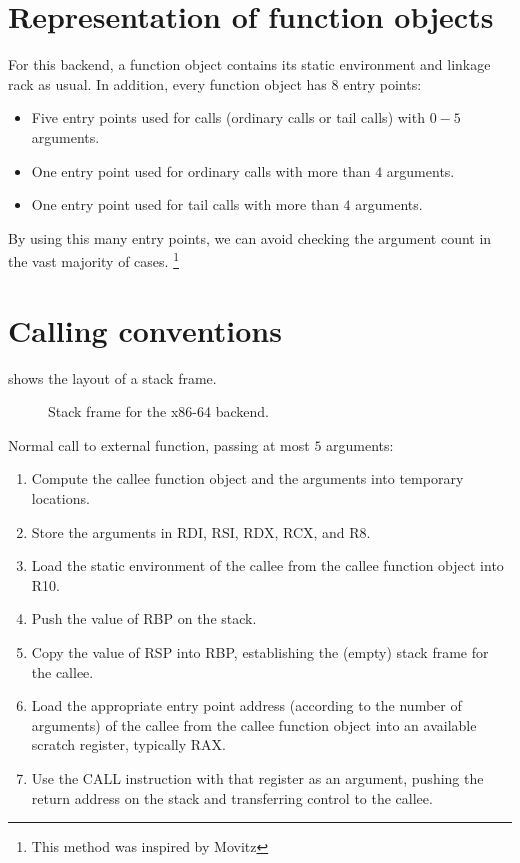 \section{Representation of function objects}

For this backend, a function object contains its static environment
and linkage rack as usual.  In addition, every function object has
$8$ entry points:

\begin{itemize}
\item Five entry points used for calls (ordinary calls or tail calls)
  with $0 - 5$ arguments.
\item One entry point used for ordinary calls with more than $4$
  arguments.
\item One entry point used for tail calls with more than $4$
  arguments.
\end{itemize}

By using this many entry points, we can avoid checking the argument
count in the vast majority of cases.%
\footnote{This method was inspired by Movitz}

\section{Calling conventions}

 shows the layout of a stack frame.

\begin{figure}
\begin{center}
\end{center}
\caption{\label{fig-x86-64-stack-frame}
Stack frame for the x86-64 backend.}
\end{figure}

Normal call to external function, passing at most $5$ arguments:

\begin{enumerate}
\item Compute the callee function object and the arguments into
  temporary locations.
\item Store the arguments in RDI, RSI, RDX, RCX, and R8.
\item Load the static environment of the callee from the callee
  function object into R10.
\item Push the value of RBP on the stack.
\item Copy the value of RSP into RBP, establishing the
  (empty) stack frame for the callee.
\item Load the appropriate entry point address (according to the
  number of arguments) of the callee from the callee function object
  into an available scratch register, typically RAX.
\item Use the CALL instruction with that register as an argument,
  pushing the return address on the stack and transferring control to
  the callee.
\end{enumerate}

